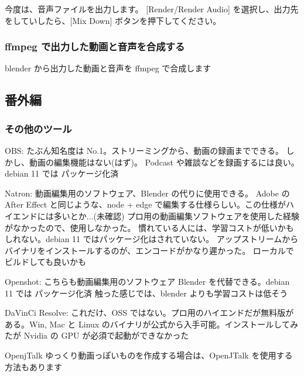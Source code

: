 \documentclass[mingoth,a4paper]{jsarticle}
\begin{document}
今度は、音声ファイルを出力します。
[Render/Render Audio] を選択し、出力先をしていしたら、[Mix Down] ボタンを押下してください。 

\subsubsection{ffmpeg で出力した動画と音声を合成する}

blender から出力した動画と音声を ffmpeg で合成します


\subsection{番外編}
\subsubsection{その他のツール}
\begin{description}
\item{OBS:
たぶん知名度は No.1。ストリーミングから、動画の録画までできる。
しかし、動画の編集機能はない(はず)。
Podcast や雑談などを録画するには良い。debian 11 では パッケージ化済}

\item{Natron:
動画編集用のソフトウェア、Blender の代りに使用できる。
Adobe の After Effect と同じような、node + edge で編集する仕様らしい。この仕様がハイエンドには多いとか...(未確認)
プロ用の動画編集ソフトウェアを使用した経験がなかったので、使用しなかった。
慣れている人には、学習コストが低いかもしれない。debian 11 ではパッケージ化はされていない。
アップストリームからバイナリをインストールするのが、エンコードがかなり遲かった。
ローカルでビルドしても良いかも}

\item{Openshot:
こちらも動画編集用のソフトウェア Blender を代替できる。debian 11 では パッケージ化済
触った感じでは、blender よりも学習コストは低そう}

\item{DaVinCi Resolve:
これだけ、OSS ではない。プロ用のハイエンドだが無料版がある。Win, Mac と Linux のバイナリが公式から入手可能。インストールしてみたが Nvidia の GPU が必須で起動ができなかった}

\item{OpenjTalk}
ゆっくり動画っぽいものを作成する場合は、OpenJTalk を使用する方法もあります

\end{description}
\end{document}
